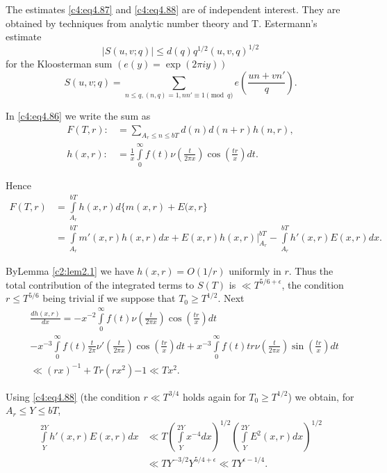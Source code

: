 The estimates \eqref{c4:eq4.87} and \eqref{c4:eq4.88} are of
independent interest. They are obtained by techniques from analytic
number theory and T. Estermann's estimate \cite{Estermann3}
\begin{equation}
  |S (u, v; q)| \leq d(q) q^{1/2} (u, v, q)^{1/2}\label{c4:eq4.89}
\end{equation}
for the Kloosterman sum $(e(y) = \exp (2 \pi i y))$
\begin{equation}
  S(u, v; q)= \sum_{n \leq q, (n, q)=1, nn' \equiv 1 \pmod{q}}
  e \left(\frac{un+ vn'}{q} \right).
\end{equation}

In \eqref{c4:eq4.86} we write the sum as 
\begin{align*}
  F(T, r) : &= \sum_{A_r \leq n \leq bT} d(n) d(n+r) h (n, r),\\
  h (x, r): & = \frac{1}{x} \int\limits_0^\infty f(t) \nu
  \left(\frac{t}{2 \pi x} \right) \cos \left(\frac{tr}{x}\right)dt.
\end{align*}

Hence
\begin{align*}
  F(T, r) & = \int\limits_{A_r}^{bT} h(x,r)d \{ m (x, r)+ E (x, r\}\\
  & = \int\limits_{A_r}^{bT} m' (x, r) h (x, r) dx + E (x, r) h (x, r)
  \Bigg|_{A_r}^{bT} - \int\limits_{A_r}^{bT} h' (x, r) E (x, r)dx.
\end{align*}

By\pageoriginale Lemma \ref{c2:lem2.1} we have $h(x, r)= O(1/r)$
uniformly in $r$. Thus the total contribution of the integrated terms
to $S(T)$ is $\ll T^{5/6+\epsilon}$, the condition $r\leq T^{5/6}$
being trivial if we suppose that $T_0 \geq T^{1/2}$. Next
\begin{align*}
&\frac{dh(x, r)}{dx}  = -x^{-2} \int\limits_0^\infty f(t) \nu
  \left(\frac{t}{2 \pi x}\right) \cos \left(\frac{tr}{x} \right) dt\\
& - x^{-3} \int\limits_0^\infty f(t) \frac{t}{2 \pi} \nu'
  \left(\frac{t}{2 \pi x} \right) \cos \left(\frac{tr}{x} \right)dt +
  x^{-3} \int\limits_0^\infty f(t) tr\nu \left(\frac{t}{2 \pi x}
  \right) \sin \left(\frac{tr}{x} \right) dt\\
&\ll (rx)^{-1} + Tr (rx^2){-1} \ll Tx^2.
\end{align*}

Using \eqref{c4:eq4.88} (the condition $r \ll T^{3/4}$ holds again for
$T_0 \geq T^{1/2}$) we obtain, for $A_r \leq Y \leq bT$,
\begin{align*}
  \int\limits_Y^{2Y} h' (x, r) E (x, r)dx & \ll T
  \left(\int\limits_Y^{2Y} x^{-4} dx \right)^{1/2}
  \left(\int\limits_Y^{2Y} E^2 (x, r)dx \right)^{1/2}\\[5pt]
  & \ll TY^{-3/2} Y^{5/4 + \epsilon} \ll TY^{\epsilon-1/4}.
\end{align*}

